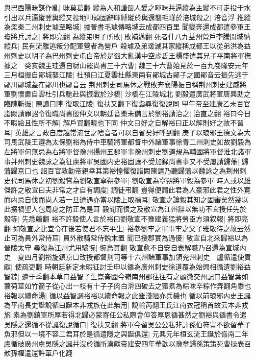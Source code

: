 與巴西陽昧謀作亂|{
	昩莫葛翻}
縱為人和謹蜀人愛之暉昩共逼縱為主縱不可走投于水引出以兵逼縱登輿縱又投地叩頭固辭暉縛縱於輿還襲毛瑾於涪城殺之|{
	涪音浮}
推縱為梁秦二州刺史璩至略城|{
	據晉書毛璩傳略城去成都四百里}
聞變奔還成都遣參軍王瓊將兵討之|{
	將即亮翻}
為縱弟明子所敗|{
	敗補邁翻}
死者什八九益州營戶李騰開城納縱兵|{
	民有流離逃叛分配軍營者為營戶}
殺璩及弟瑗滅其家縱稱成都王以從弟洪為益州刺史以明子為巴州刺史屯白帝於是蜀大亂漢中空虚氐王楊盛遣其兄子平南將軍撫據之　癸亥魏主珪還自豺山罷尚書三十六曹|{
	魏三十六曹始見於一百九卷隆安元年}
三月桓振自鄖城襲江陵|{
	杜預曰江夏雲杜縣東南有鄖城古鄖子之國鄖音云振先逃于鄖川鄖城蓋在鄖川也鄖音云}
荆州刺史司馬休之戰敗奔襄陽振自稱荆州刺史建威將軍劉懷肅自雲杜引兵馳赴與振戰於沙橋|{
	沙橋在江陵城北}
劉毅遣廣武將軍唐興助之臨陳斬振|{
	陳讀曰陣}
復取江陵|{
	復扶又翻下復詣尋復復說同}
甲午帝至建康乙未百官詣闕請罪詔令復職尚書殷仲文以朝廷音樂未備言於劉裕請治之|{
	治直之翻}
裕曰今日不暇給且性所不解|{
	解戶買翻曉也下同}
仲文曰好之自解裕曰正以解則好之故不習耳|{
	英雄之言政自度越常流世之嗜音者可以自省矣好呼到翻}
庚子以琅邪王德文為大司馬武陵王遵為太保劉裕為侍中車騎將軍都督中外諸軍事徐青二州刺史如故劉毅為左將軍何無忌為右將軍督豫州揚州五郡軍事豫州刺史劉道規為輔國將軍督淮北諸軍事并州刺史魏詠之為征虜將軍吳國内史裕固讓不受加録尚書事又不受屢請歸藩|{
	歸藩歸京口也}
詔百官敦勸帝親幸其第裕惶懼復詣闕陳請乃聽歸藩以魏詠之為荆州刺史代司馬休之初劉毅嘗為劉敬宣寧朔參軍|{
	劉敬宣為寜朔將軍毅為參軍}
時人或以雄傑許之敬宣曰夫非常之才自有調度|{
	調徒弔翻}
豈得便謂此君為人豪邪此君之性外寛而内忌自伐而尚人若一旦遭遇亦當以陵上取禍耳|{
	敬宣之論毅其知之固審矣然幾以此掇禍聖人包周身之防正為是耳}
毅聞而恨之及敬宣為江州辭以無功不宜授任先於毅等|{
	先悉薦翻}
裕不許毅使人言於裕曰劉敬宣不豫建義猛將勞臣方須叙報|{
	將即亮翻}
如敬宣之比宜令在後若使君不忘平生|{
	裕參劉牢之軍事牢之父子雅敬待之故云然}
止可為員外常侍耳|{
	員外散騎常侍魏末置}
聞已授郡實為過優|{
	敬宣自北來歸裕以為晉陵太守}
尋復為江州尤用駭惋|{
	惋烏貫翻}
敬宣愈不自安自表解職乃召還為宣城内史　夏四月劉裕旋鎮京口改授都督荆司等十六州諸軍事加領兖州刺史　盧循遣使貢獻|{
	使疏吏翻}
時朝廷新定未暇征討壬申以循為廣州刺史徐道覆為始興相循遺劉裕益智粽|{
	遺于季翻本草曰益智子生崑崙國今嶺南州郡往往有之顧微交州記曰益智葉如蘘荷莖如竹箭子從心出一枝有十子子肉白滑四破去之蜜煮為粽味辛粽作弄翻角黍也}
裕報以續命湯|{
	循以益智調裕裕以續命報之此雖淺陋亦兵機也}
循以前琅邪内史王誕為平南長史誕說循曰誕本非戎旅在此無用|{
	說輸芮翻王氏江南衣冠稱首故云本非戎旅}
素為劉鎮軍所厚若得北歸必蒙寄任公私際會仰答厚恩循甚然之劉裕與循書令遣吳隱之還循不從誕復說循曰|{
	復扶又翻}
將軍今留吳公公私非計孫伯符豈不欲留華子魚邪但以一境不容二君耳於是循遣隱之與誕俱還|{
	元興元年桓玄流王誕於嶺南二年盧循破廣州虜吳隱之誕并沒於循所漢獻帝建安四年華歆以豫章歸孫策策死曹操表召歆孫權遣還許華戶化翻}
